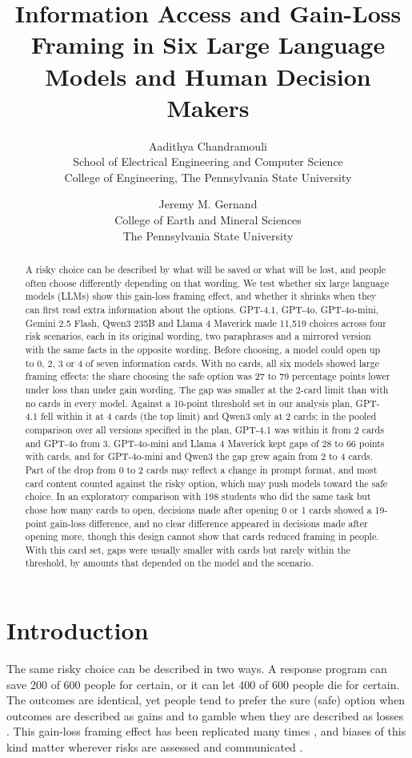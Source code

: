 \documentclass[11pt]{article}
\title{Information Access and Gain-Loss Framing in Six Large Language Models and Human Decision Makers}
\author{
  Aadithya Chandramouli\\
  School of Electrical Engineering and Computer Science\\
  College of Engineering, The Pennsylvania State University
  \and
  Jeremy M. Gernand\\
  College of Earth and Mineral Sciences\\
  The Pennsylvania State University
}
\date{}
\begin{document}
\maketitle
\begin{abstract}
A risky choice can be described by what will be saved or what will be lost, and people often choose differently depending on that wording. We test whether six large language models (LLMs) show this gain-loss framing effect, and whether it shrinks when they can first read extra information about the options. GPT-4.1, GPT-4o, GPT-4o-mini, Gemini 2.5 Flash, Qwen3 235B and Llama 4 Maverick made 11,519 choices across four risk scenarios, each in its original wording, two paraphrases and a mirrored version with the same facts in the opposite wording. Before choosing, a model could open up to 0, 2, 3 or 4 of seven information cards. With no cards, all six models showed large framing effects: the share choosing the safe option was 27 to 79 percentage points lower under loss than under gain wording. The gap was smaller at the 2-card limit than with no cards in every model. Against a 10-point threshold set in our analysis plan, GPT-4.1 fell within it at 4 cards (the top limit) and Qwen3 only at 2 cards; in the pooled comparison over all versions specified in the plan, GPT-4.1 was within it from 2 cards and GPT-4o from 3. GPT-4o-mini and Llama 4 Maverick kept gaps of 28 to 66 points with cards, and for GPT-4o-mini and Qwen3 the gap grew again from 2 to 4 cards. Part of the drop from 0 to 2 cards may reflect a change in prompt format, and most card content counted against the risky option, which may push models toward the safe choice. In an exploratory comparison with 198 students who did the same task but chose how many cards to open, decisions made after opening 0 or 1 cards showed a 19-point gain-loss difference, and no clear difference appeared in decisions made after opening more, though this design cannot show that cards reduced framing in people. With this card set, gaps were usually smaller with cards but rarely within the threshold, by amounts that depended on the model and the scenario.
\end{abstract}

\section{Introduction}

The same risky choice can be described in two ways. A response program can save 200 of 600 people for certain, or it can let 400 of 600 people die for certain. The outcomes are identical, yet people tend to prefer the sure (safe) option when outcomes are described as gains and to gamble when they are described as losses \citep{tversky1981framing}. This gain-loss framing effect has been replicated many times \citep{kuhberger1998influence}, and biases of this kind matter wherever risks are assessed and communicated \citep{montibeller2015cognitive,gernand2023set}.
\end{document}
